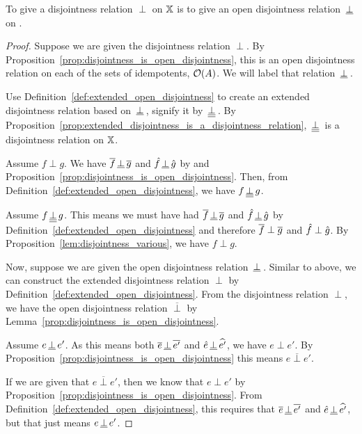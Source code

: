 \begin{theorem}\label{thm:open_disjointness_is_disjointness}
   To give a disjointness relation $\perp$ on $\mathbb{X}$ is to give an open disjointness relation
   $\,\underline{\perp}\,$ on \X.
\end{theorem}
\begin{proof}
  Suppose we are given the disjointness relation $\perp$. By
  Proposition~\ref{prop:disjointness_is_open_disjointness}, this is an open disjointness relation
  on each of the sets of idempotents, $\mathcal{O}({A})$. We will label that relation $\,\underline{\perp}\,$.

  Use Definition~\ref{def:extended_open_disjointness} to create an extended
  disjointness relation based on $\,\underline{\perp}\,$, signify it by $\,\underline{\underline{\perp}}\,$.
  By Proposition~\ref{prop:extended_disjointness_is_a_disjointness_relation}, $\,\underline{\underline{\perp}}\,$ is
  a disjointness relation on $\mathbb{X}$.

  Assume $f\perp g$. We have $\overline{f}\,\underline{\perp}\,\overline{g}$ and $\hat{f}\,\underline{\perp}\,\hat{g}$ by
   and Proposition~\ref{prop:disjointness_is_open_disjointness}. Then, from
  Definition~\ref{def:extended_open_disjointness}, we have $f \,\underline{\underline{\perp}}\, g$.

  Assume $f \,\underline{\underline{\perp}}\, g$. This means we must have had $\overline{f}\,\underline{\perp}\,\overline{g}$ and
  $\hat{f}\,\underline{\perp}\,\hat{g}$
  by Definition~\ref{def:extended_open_disjointness} and therefore $\overline{f}\perp\overline{g}$ and
  $\hat{f}\perp\hat{g}$. By Proposition~\ref{lem:disjointness_various}, we have $f \perp g$.


  Now, suppose we are given the open disjointness relation $\,\underline{\perp}\,$. Similar to above, we can
  construct the extended disjointness relation $\perp$ by
  Definition~\ref{def:extended_open_disjointness}. From the disjointness relation $\perp$, we have
  the open disjointness relation $\overline{\perp}$ by
  Lemma~\ref{prop:disjointness_is_open_disjointness}.

  Assume $e \,\underline{\perp}\, e'$. As this means both $\overline{e} \,\underline{\perp}\, \overline{e'}$ and
  $\hat{e} \,\underline{\perp}\, \widehat{e'}$, we have $e \perp e'$. By
  Proposition~\ref{prop:disjointness_is_open_disjointness} this means $e \overline{\perp} e'$.

  If we are given that $e \overline{\perp} e'$, then we know that $e \perp e'$ by
  Proposition~\ref{prop:disjointness_is_open_disjointness}. From
  Definition~\ref{def:extended_open_disjointness}, this requires that $\overline{e} \,\underline{\perp}\, \overline{e'}$
  and $\hat{e} \,\underline{\perp}\, \widehat{e'}$, but that just means $e \,\underline{\perp}\, e'$.
\end{proof}

